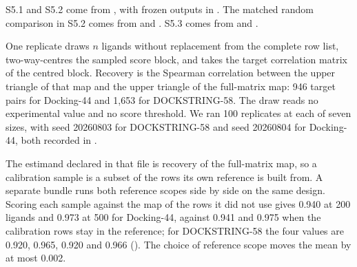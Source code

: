 
S5.1 and S5.2 come from , with frozen outputs in
. The matched random comparison in S5.2 comes from
 and
. S5.3 comes from
 and .


One replicate draws $n$ ligands without replacement from the complete row list, two-way-centres
the sampled score block, and takes the target correlation matrix of the centred block. Recovery
is the Spearman correlation between the upper triangle of that map and the upper triangle of the
full-matrix map: 946 target pairs for Docking-44 and 1{,}653 for DOCKSTRING-58. The draw reads no
experimental value and no score threshold. We ran 100 replicates at each of seven sizes, with
seed 20260803 for DOCKSTRING-58 and seed 20260804 for Docking-44, both recorded in
.

The estimand declared in that file is recovery of the full-matrix map, so a calibration sample is
a subset of the rows its own reference is built from. A separate bundle runs both reference
scopes side by side on the same design. Scoring each sample against the map of the rows it did
not use gives 0.940 at 200 ligands and 0.973 at 500 for Docking-44, against 0.941 and 0.975 when
the calibration rows stay in the reference; for DOCKSTRING-58 the four values are 0.920, 0.965,
0.920 and 0.966
(). The choice of
reference scope moves the mean by at most 0.002.


